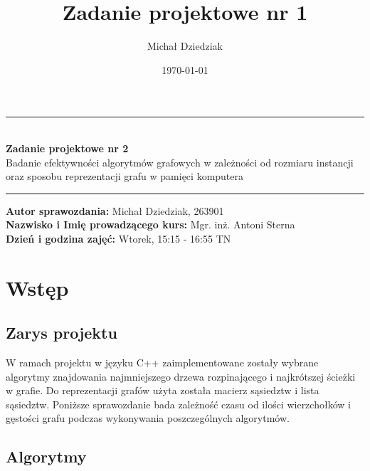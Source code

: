 \documentclass{article}
\title{Zadanie projektowe nr 1}
\author{Michał Dziedziak}
\date{\today}
\begin{document}
\begin{titlepage}
    \begin{center}
        \vspace*{5cm}
        \rule{500pt}{1pt}\\
        \vspace*{0.5cm}
        \LARGE
        \textbf{Zadanie projektowe nr 2}\\
        \Large
        Badanie efektywności algorytmów grafowych w zależności od rozmiaru instancji
        oraz sposobu reprezentacji grafu w pamięci komputera \\
        \vspace*{0.5cm}
        \rule{500pt}{1pt}
    \end{center}

    \vspace*{12cm}

    {\raggedright
        \large
        \textbf{Autor sprawozdania:} Michał Dziedziak,  263901\\
        \textbf{Nazwisko i Imię prowadzącego kurs:} Mgr. inż. Antoni Sterna\\
        \textbf{Dzień i godzina zajęć:} Wtorek, 15:15 - 16:55 TN
    }
\end{titlepage}


\tableofcontents
\listoftables
\listoffigures


\newpage

\section{Wstęp}
    \subsection{Zarys projektu}
    W ramach projektu w języku C++ zaimplementowane zostały wybrane algorytmy znajdowania najmniejszego
    drzewa rozpinającego i najkrótszej ścieżki w grafie. Do reprezentacji grafów użyta została macierz sąsiedztw i lista sąsiedztw. 
    Poniższe sprawozdanie bada zależność czasu od ilości wierzchołków i gęstości grafu podczas wykonywania poszczególnych algorytmów.

    \subsection{Algorytmy}
\end{document}
